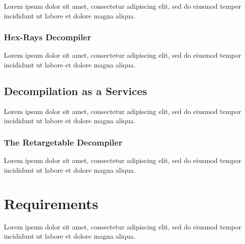 \documentclass[12pt, a4paper]{article}
\begin{document}
Lorem ipsum dolor sit amet, consectetur adipiscing elit, sed do eiusmod tempor incididunt ut labore et dolore magna aliqua.



\subsubsection{Hex-Rays Decompiler}

Lorem ipsum dolor sit amet, consectetur adipiscing elit, sed do eiusmod tempor incididunt ut labore et dolore magna aliqua.

\cite{hexrays}


\subsection{Decompilation as a Services}

Lorem ipsum dolor sit amet, consectetur adipiscing elit, sed do eiusmod tempor incididunt ut labore et dolore magna aliqua.


\subsubsection{The Retargetable Decompiler}

Lorem ipsum dolor sit amet, consectetur adipiscing elit, sed do eiusmod tempor incididunt ut labore et dolore magna aliqua.

\cite{retargetable_decomp}



\section{Requirements}

Lorem ipsum dolor sit amet, consectetur adipiscing elit, sed do eiusmod tempor incididunt ut labore et dolore magna aliqua.
\end{document}
